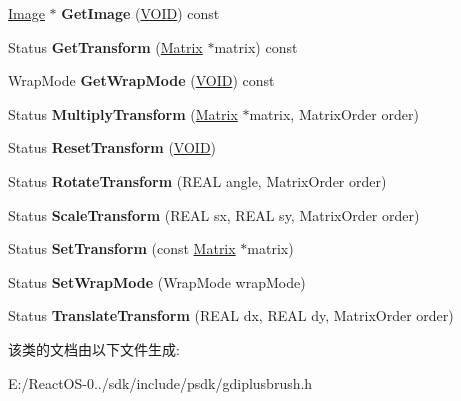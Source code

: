 \begin{DoxyCompactItemize}
\item 
\mbox{\label{class_texture_brush_a6aab0a6ee87b4217beae11309cf2a60d}} 
\hyperlink{class_image}{Image} $\ast$ {\bfseries Get\+Image} (\hyperlink{interfacevoid}{V\+O\+ID}) const
\item 
\mbox{\label{class_texture_brush_abf35472b1f06f57d56cc4ea6ddd5217c}} 
Status {\bfseries Get\+Transform} (\hyperlink{class_matrix}{Matrix} $\ast$matrix) const
\item 
\mbox{\label{class_texture_brush_a99d221f8598f2cdf42493415e403f1ca}} 
Wrap\+Mode {\bfseries Get\+Wrap\+Mode} (\hyperlink{interfacevoid}{V\+O\+ID}) const
\item 
\mbox{\label{class_texture_brush_a19b92121e67b996ed0debf38ee1571dc}} 
Status {\bfseries Multiply\+Transform} (\hyperlink{class_matrix}{Matrix} $\ast$matrix, Matrix\+Order order)
\item 
\mbox{\label{class_texture_brush_a04769c84970808eacec19f73aa37d156}} 
Status {\bfseries Reset\+Transform} (\hyperlink{interfacevoid}{V\+O\+ID})
\item 
\mbox{\label{class_texture_brush_a1b334e45d805471ec2490a91835d3e00}} 
Status {\bfseries Rotate\+Transform} (R\+E\+AL angle, Matrix\+Order order)
\item 
\mbox{\label{class_texture_brush_a52b01c8dd19844979c1d693c3ed1dcee}} 
Status {\bfseries Scale\+Transform} (R\+E\+AL sx, R\+E\+AL sy, Matrix\+Order order)
\item 
\mbox{\label{class_texture_brush_abc7bdd603f3ffcdf4796aa32aa539ee1}} 
Status {\bfseries Set\+Transform} (const \hyperlink{class_matrix}{Matrix} $\ast$matrix)
\item 
\mbox{\label{class_texture_brush_a1dc7c259a49e72850c5aa633c79ed56b}} 
Status {\bfseries Set\+Wrap\+Mode} (Wrap\+Mode wrap\+Mode)
\item 
\mbox{\label{class_texture_brush_a557b48265ef53856bf6ed75180f9b98c}} 
Status {\bfseries Translate\+Transform} (R\+E\+AL dx, R\+E\+AL dy, Matrix\+Order order)
\end{DoxyCompactItemize}


该类的文档由以下文件生成\+:\begin{DoxyCompactItemize}
\item 
E\+:/\+React\+O\+S-\/0../sdk/include/psdk/gdiplusbrush.\+h\end{DoxyCompactItemize}
